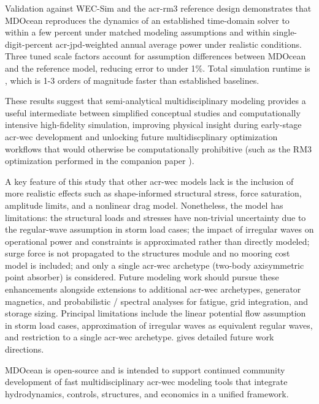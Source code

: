 Validation against WEC-Sim and the \gls{acr-rm3} reference design demonstrates that MDOcean reproduces the dynamics of an established time-domain solver to within a few percent under matched modeling assumptions and within single-digit-percent \gls{acr-jpd}-weighted annual average power under realistic conditions.
Three tuned scale factors account for assumption differences between MDOcean and the reference model, reducing error to under 1\%.
Total simulation runtime is \resultsAOR[simRuntime], which is 1-3 orders of magnitude faster than established baselines.

These results suggest that semi-analytical multidisciplinary modeling provides a useful intermediate between simplified conceptual studies and computationally intensive high-fidelity simulation,
improving physical insight during early-stage \gls{acr-wec} development
and unlocking future multidiscplinary optimization workflows that would otherwise be computationally prohibitive (such as the RM3 optimization performed in the companion paper \citep{mccabe_leveraging_2026}).

\ifdefined\DISSERTATION
    A key feature of this study that other \gls{acr-wec} models lack is the inclusion of more realistic effects such as shape-informed structural stress, force saturation, amplitude limits, and a nonlinear drag model.
    Nonetheless, the model has limitations: the structural loads and stresses have non-trivial uncertainty due to the regular-wave assumption in storm load cases; the impact of irregular waves on operational power and constraints is approximated rather than directly modeled; surge force is not propagated to the structures module and no mooring cost model is included; and only a single \gls{acr-wec} archetype (two-body axisymmetric point absorber) is considered.
    Future modeling work should pursue these enhancements alongside extensions to additional \gls{acr-wec} archetypes, generator magnetics, and probabilistic / spectral analyses for fatigue, grid integration, and storage sizing.
\else
    Principal limitations include the linear potential flow assumption in storm load cases,
    approximation of irregular waves as equivalent regular waves,
    and restriction to a single \gls{acr-wec} archetype.
     gives detailed future work directions.
\fi

MDOcean is open-source and is intended to support continued community development of fast multidisciplinary \gls{acr-wec} modeling tools that integrate hydrodynamics, controls, structures, and economics in a unified framework.